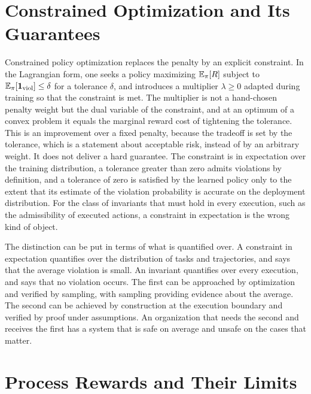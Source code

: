 \section{Constrained Optimization and Its Guarantees}

Constrained policy optimization replaces the penalty by an explicit constraint. In the Lagrangian form, one seeks a policy maximizing $\mathbb{E}_\pi[R]$ subject to $\mathbb{E}_\pi[\mathbf 1_{\mathrm{viol}}]\le\delta$ for a tolerance $\delta$, and introduces a multiplier $\lambda\ge0$ adapted during training so that the constraint is met. The multiplier is not a hand-chosen penalty weight but the dual variable of the constraint, and at an optimum of a convex problem it equals the marginal reward cost of tightening the tolerance. This is an improvement over a fixed penalty, because the tradeoff is set by the tolerance, which is a statement about acceptable risk, instead of by an arbitrary weight. It does not deliver a hard guarantee. The constraint is in expectation over the training distribution, a tolerance greater than zero admits violations by definition, and a tolerance of zero is satisfied by the learned policy only to the extent that its estimate of the violation probability is accurate on the deployment distribution. For the class of invariants that must hold in every execution, such as the admissibility of executed actions, a constraint in expectation is the wrong kind of object.

The distinction can be put in terms of what is quantified over. A constraint in expectation quantifies over the distribution of tasks and trajectories, and says that the average violation is small. An invariant quantifies over every execution, and says that no violation occurs. The first can be approached by optimization and verified by sampling, with sampling providing evidence about the average. The second can be achieved by construction at the execution boundary and verified by proof under assumptions. An organization that needs the second and receives the first has a system that is safe on average and unsafe on the cases that matter.

\section{Process Rewards and Their Limits}

